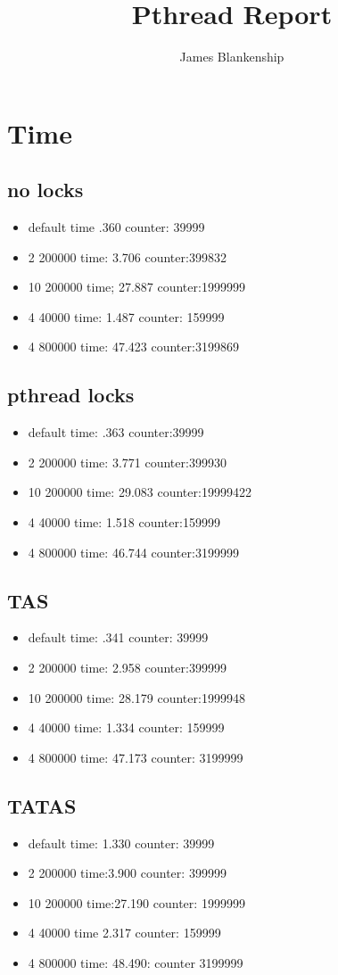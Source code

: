 \documentclass[12pt,letterpaper,notitlepage]{article}
\title{Pthread Report}
\author{James Blankenship}
\begin{document}
\maketitle
\section{Time}
\subsection{no locks}
\begin{itemize}
    \item default time .360 counter: 39999
    \item  2 200000 time:  3.706 counter:399832
    \item 10 200000 time; 27.887 counter:1999999
    \item 4 40000 time: 1.487 counter: 159999
    \item  4 800000 time: 47.423 counter:3199869
\end{itemize}
\subsection{pthread locks }
\begin{itemize}
    \item default time: .363 counter:39999
    \item  2 200000 time:  3.771 counter:399930
    \item 10 200000 time: 29.083 counter:19999422
    \item  4 40000 time: 1.518 counter:159999
    \item 4 800000 time: 46.744 counter:3199999
\end{itemize}
\subsection{TAS}
\begin{itemize}
    \item default time: .341 counter: 39999
    \item 2 200000 time: 2.958 counter:399999
    \item  10 200000 time: 28.179 counter:1999948
    \item 4 40000 time: 1.334 counter: 159999
    \item  4 800000 time: 47.173 counter: 3199999
\end{itemize}
\subsection{TATAS}
\begin{itemize}
    \item default time: 1.330 counter: 39999
    \item  2 200000 time:3.900 counter: 399999
    \item 10 200000 time:27.190 counter: 1999999
    \item   4 40000 time 2.317 counter: 159999
    \item 4 800000 time: 48.490: counter 3199999
\end{itemize}
\end{document}
